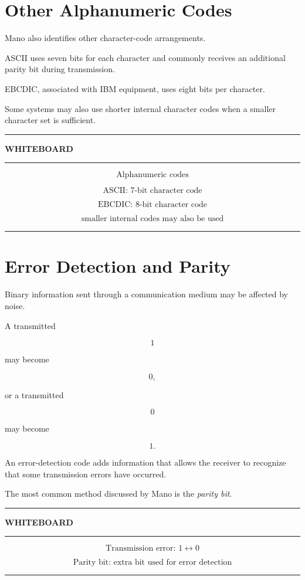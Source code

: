 \documentclass[11pt]{article}
\newenvironment{whiteboard}
{
    \par\medskip
    \begin{center}
    \begin{minipage}{0.94\textwidth}
    \hrule
    \vspace{0.4em}
    \textbf{\large WHITEBOARD}
    \vspace{0.3em}
    \hrule
    \vspace{0.7em}
}
{
    \vspace{0.5em}
    \hrule
    \end{minipage}
    \end{center}
    \medskip
}
\begin{document}
\section{Other Alphanumeric Codes}

Mano also identifies other character-code arrangements.

ASCII uses seven bits for each character and commonly receives an additional
parity bit during transmission.

EBCDIC, associated with IBM equipment, uses eight bits per character.

Some systems may also use shorter internal character codes when a smaller
character set is sufficient.

\begin{whiteboard}
\[
\boxed{\text{Alphanumeric codes}}
\]

\[
\text{ASCII: 7-bit character code}
\]

\[
\text{EBCDIC: 8-bit character code}
\]

\[
\text{smaller internal codes may also be used}
\]
\end{whiteboard}

\section{Error Detection and Parity}

Binary information sent through a communication medium may be affected by
noise.

A transmitted

\[
1
\]

may become

\[
0,
\]

or a transmitted

\[
0
\]

may become

\[
1.
\]

An error-detection code adds information that allows the receiver to recognize
that some transmission errors have occurred.

The most common method discussed by Mano is the \emph{parity bit}.

\begin{whiteboard}
\[
\boxed{\text{Transmission error: }1\leftrightarrow0}
\]

\[
\boxed{\text{Parity bit: extra bit used for error detection}}
\]
\end{whiteboard}
\end{document}
